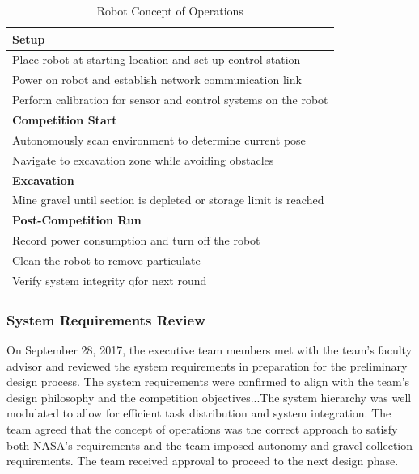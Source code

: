 \documentclass[class=article, crop=false]{standalone}
\begin{document}
	\FloatBarrier
	\begin{table}[h]
	\centering
	\begin{tabular}{ | m{38em} | } 
 	\hline
 		\textbf{Setup} \\ 
 		\hline
 		Place robot at starting location and set up control station \\ 
 		\hline
 		Power on robot and establish network communication link \\ 
 		\hline
 		Perform calibration for sensor and control systems on the robot \\
 		\hline
 		\textbf{Competition Start} \\ 
 		\hline
 		Autonomously scan environment to determine current pose \\
 		\hline
 		Navigate to excavation zone while avoiding obstacles  \\
 		\hline
 		\textbf{Excavation} \\
 		\hline
		Mine gravel until section is depleted or storage limit is reached \\
 		\hline
 		\textbf{Post-Competition Run} \\
 		\hline
 		Record power consumption and turn off the robot \\
 		\hline
 		Clean the robot to remove particulate \\
 		\hline
 		Verify system integrity qfor next round \\
 		\hline
	\end{tabular}
	\caption{Robot Concept of Operations}
		\label{table:con_ops}
	\end{table}
	\FloatBarrier
	
	\subsubsection{System Requirements Review}
	On September 28, 2017, the executive team members met with the team’s faculty advisor and reviewed the system requirements in preparation for the preliminary design process. The system requirements were confirmed to align with the team’s design philosophy and the competition objectives...The system hierarchy was well modulated to allow for efficient task distribution and system integration. The team agreed that the concept of operations was the correct approach to satisfy both NASA’s requirements and the team-imposed autonomy and gravel collection requirements. The team received approval to proceed to the next design phase.



	
\end{document}
